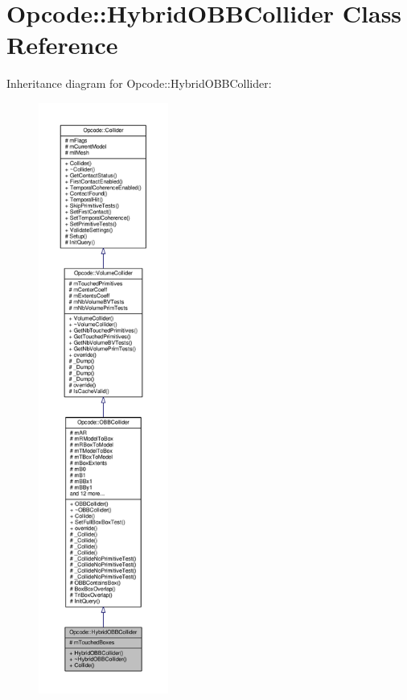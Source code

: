 \hypertarget{classOpcode_1_1HybridOBBCollider}{}\section{Opcode\+:\+:Hybrid\+O\+B\+B\+Collider Class Reference}
\label{classOpcode_1_1HybridOBBCollider}


Inheritance diagram for Opcode\+:\+:Hybrid\+O\+B\+B\+Collider\+:
\nopagebreak
\begin{figure}[H]
\begin{center}
\leavevmode
\includegraphics[height=550pt]{d7/d43/classOpcode_1_1HybridOBBCollider__inherit__graph}
\end{center}
\end{figure}


